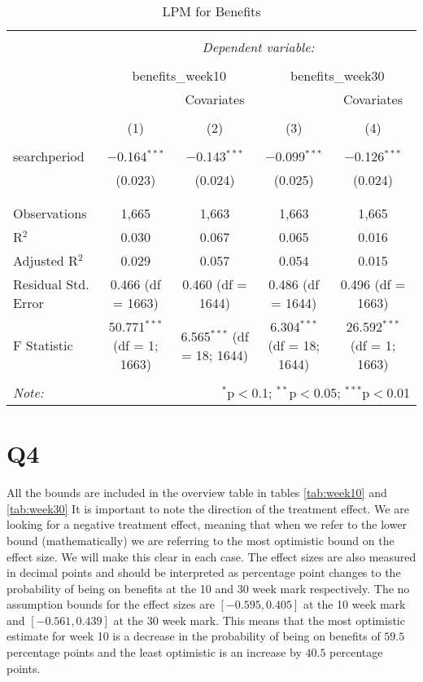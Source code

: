 \documentclass[
]{article}
\begin{document}
\begin{table}[!htbp] \centering 
  \caption{LPM for Benefits} 
  \label{tab:reg} 
\begin{tabular}{@{\extracolsep{5pt}}lcccc} 
\\[-1.8ex]\hline 
\hline \\[-1.8ex] 
 & \multicolumn{4}{c}{\textit{Dependent variable:}} \\ 
\cline{2-5} 
\\[-1.8ex] & \multicolumn{2}{c}{benefits\_week10} & \multicolumn{2}{c}{benefits\_week30} \\ 
 &  & Covariates &  & Covariates \\ 
\\[-1.8ex] & (1) & (2) & (3) & (4)\\ 
\hline \\[-1.8ex] 
 searchperiod & $-$0.164$^{***}$ & $-$0.143$^{***}$ & $-$0.099$^{***}$ & $-$0.126$^{***}$ \\ 
  & (0.023) & (0.024) & (0.025) & (0.024) \\ 
  & & & & \\ 
\hline \\[-1.8ex] 
Observations & 1,665 & 1,663 & 1,663 & 1,665 \\ 
R$^{2}$ & 0.030 & 0.067 & 0.065 & 0.016 \\ 
Adjusted R$^{2}$ & 0.029 & 0.057 & 0.054 & 0.015 \\ 
Residual Std. Error & 0.466 (df = 1663) & 0.460 (df = 1644) & 0.486 (df = 1644) & 0.496 (df = 1663) \\ 
F Statistic & 50.771$^{***}$ (df = 1; 1663) & 6.565$^{***}$ (df = 18; 1644) & 6.304$^{***}$ (df = 18; 1644) & 26.592$^{***}$ (df = 1; 1663) \\ 
\hline 
\hline \\[-1.8ex] 
\textit{Note:}  & \multicolumn{4}{r}{$^{*}$p$<$0.1; $^{**}$p$<$0.05; $^{***}$p$<$0.01} \\ 
\end{tabular} 
\end{table}

\hypertarget{q4}{%
\section{Q4}\label{q4}}

All the bounds are included in the overview table in tables
\ref{tab:week10} and \ref{tab:week30} It is important to note the
direction of the treatment effect. We are looking for a negative
treatment effect, meaning that when we refer to the lower bound
(mathematically) we are referring to the most optimistic bound on the
effect size. We will make this clear in each case. The effect sizes are
also measured in decimal points and should be interpreted as percentage
point changes to the probability of being on benefits at the 10 and 30
week mark respectively. The no assumption bounds for the effect sizes
are \([-0.595, 0.405]\) at the 10 week mark and \([-0.561, 0.439]\) at
the 30 week mark. This means that the most optimistic estimate for week
10 is a decrease in the probability of being on benefits of \(59.5\)
percentage points and the least optimistic is an increase by \(40.5\)
percentage points.
\end{document}
